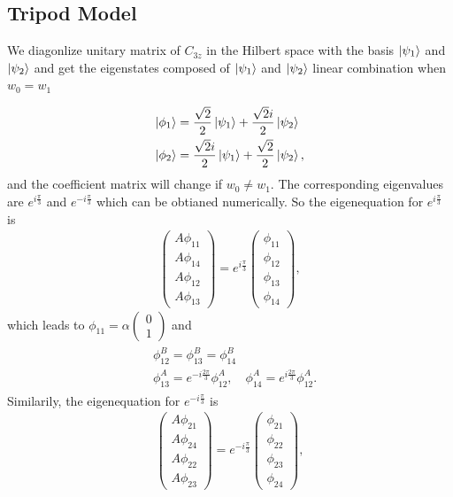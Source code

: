 \documentclass[10pt, oneside]{article}
\begin{document}
\subsection{Tripod Model}
We diagonlize unitary matrix of \(C_{3z}\) in the Hilbert space with the basis \(\ket{\psi_{1}}\) and \(\ket{\psi_{2}}\) and get the eigenstates composed of \(\ket{\psi_{1}}\) and \(\ket{\psi_{2}}\) linear combination when \(w_0 = w_1\)

\begin{align}
	\begin{split}
		\ket{\phi_{1}} & = \frac{\sqrt{2}}{2} \ket{\psi_{1}} + \frac{\sqrt{2}i}{2} \ket{\psi_{2}} \\
		\ket{\phi_{2}} & = \frac{\sqrt{2}i}{2} \ket{\psi_{1}} + \frac{\sqrt{2}}{2} \ket{\psi_{2}},
	\end{split}
\end{align}
and the coefficient matrix will change if \(w_0 \neq w_1\). The corresponding eigenvalues are \(e^{i \frac{\pi}{3}} \) and \(e^{- i \frac{\pi}{3} }\) which can be obtianed numerically. So the eigenequation for \(e^{i \frac{\pi}{3}}\) is
\begin{align}
	\begin{pmatrix}
		A \phi_{11} \\  A \phi_{14} \\ A \phi_{12} \\ A \phi_{13}
	\end{pmatrix} = e^{i \frac{\pi}{3}} \begin{pmatrix}
		\phi_{11} \\ \phi_{12} \\ \phi_{13} \\ \phi_{14}
	\end{pmatrix},
\end{align}
which leads to \(\phi_{11} = \alpha \begin{pmatrix}
	0 \\ 1
\end{pmatrix}\)
and 
\begin{align}
	\begin{split}
		&\phi_{12}^{B} = \phi_{13}^{B} = \phi_{14}^{B} \\
		&\phi_{13}^{A} = e^{-i\frac{2 \pi}{3}} \phi_{12}^{A}, \quad \phi_{14}^{A} = e^{i\frac{2 \pi}{3}} \phi_{12}^{A}.
	\end{split}
\end{align}
Similarily, the eigenequation for \(e^{-i \frac{\pi}{3}}\) is
\begin{align}
	\begin{pmatrix}
		A \phi_{21} \\  A \phi_{24} \\ A \phi_{22} \\ A \phi_{23}
	\end{pmatrix} = e^{-i \frac{\pi}{3}} \begin{pmatrix}
		\phi_{21} \\ \phi_{22} \\ \phi_{23} \\ \phi_{24}
	\end{pmatrix},
\end{align}
\end{document}
